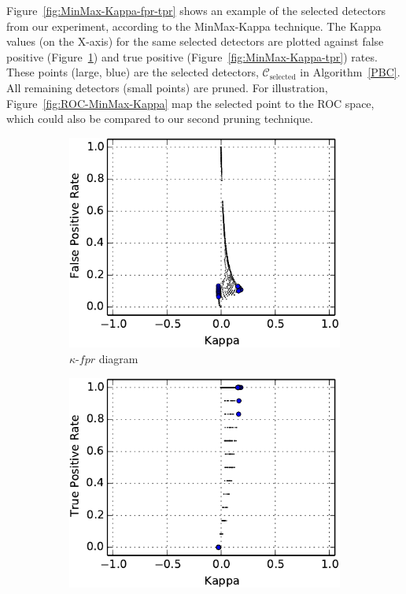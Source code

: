 Figure~\ref{fig:MinMax-Kappa-fpr-tpr} shows an example of the selected detectors from our experiment, according to the MinMax-Kappa technique.
The Kappa values (on the X-axis) for the same selected detectors are plotted against false positive (Figure~\ref{fig:MinMax-Kappa-fpr}) and true positive  (Figure~\ref{fig:MinMax-Kappa-tpr}) rates.
These points (large, blue) are the selected detectors, $\mathcal{C}_{\mbox{selected}}$ in Algorithm~\ref{PBC}.
All remaining detectors (small points) are pruned.
For illustration, Figure~\ref{fig:ROC-MinMax-Kappa} map the selected point to the ROC space, which could also be compared to our second pruning technique.

\begin{figure}[tbh]
    \centering
    \begin{adjustbox}{minipage=\linewidth,scale=0.8}
    \begin{subfigure}[b]{\columnwidth}
        \centering
        \includegraphics[width=\linewidth]{figs/Kappa-fpr-selected-crop}
        \caption{$\kappa$-$fpr$ diagram}
        \label{fig:MinMax-Kappa-fpr}
    \vspace{0.7cm}
    \end{subfigure}
    \begin{subfigure}[b]{\columnwidth}
        \centering
        \includegraphics[width=\linewidth]{figs/Kappa-tpr-selected-crop}

\end{subfigure}
\end{adjustbox}
\end{figure}
